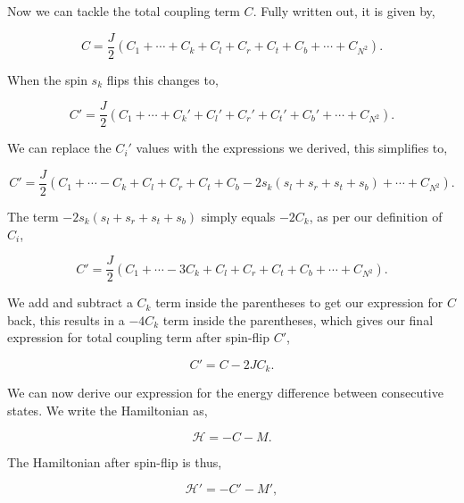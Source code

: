 \documentclass{IAYCPro}
\begin{document}
Now we can tackle the total coupling term $C$. Fully written out, it is given by,

\begin{equation}
    C = \frac{J}{2}\left(C_1 + \cdots + C_k + C_l + C_r + C_t + C_b + \cdots + C_{N^2} \right).
\end{equation}

When the spin $s_k$ flips this changes to,

\begin{equation}
    C' = \frac{J}{2}\left(C_1 + \cdots + C_k' + C_l' + C_r' + C_t' + C_b' + \cdots + C_{N^2} \right).
\end{equation}

We can replace the $C_i'$ values with the expressions we derived, this simplifies to,

\begin{equation}
    C' = \frac{J}{2}\left(C_1 + \cdots -C_k + C_l + C_r + C_t + C_b -2s_k(s_l + s_r + s_t + s_b)  + \cdots + C_{N^2} \right).
\end{equation}

\raggedbottom
\newpage

The term $-2s_k(s_l + s_r + s_t + s_b)$ simply equals $-2C_k$, as per our definition of $C_i$,

\begin{equation}
    C' = \frac{J}{2}\left(C_1 + \cdots -3C_k + C_l + C_r + C_t + C_b  + \cdots + C_{N^2} \right).
\end{equation}

We add and subtract a $C_k$ term inside the parentheses to get our expression for $C$ back, this results in a $-4C_k$ term inside the parentheses, which gives our final expression for total coupling term after spin-flip $C'$,

\begin{equation}
    C' = C - 2JC_k.
\end{equation}

We can now derive our expression for the energy difference between consecutive states. We write the Hamiltonian as,

\begin{equation}
    \mathcal{H} = -C -M.
\end{equation}

The Hamiltonian after spin-flip is thus,

\begin{equation}
    \mathcal{H}' = -C' - M',
\end{equation}
\end{document}
